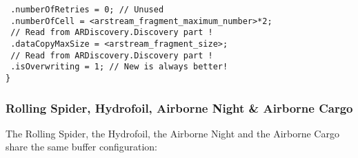 \begin{itemize}
{    \texttt{  .numberOfRetries = 0; // Unused}\\
    \texttt{  .numberOfCell = <arstream\_fragment\_maximum\_number>*2;}\\
    \texttt{                  // Read from ARDiscovery.Discovery part !}\\
    \texttt{  .dataCopyMaxSize = <arstream\_fragment\_size>;}\\
    \texttt{                     // Read from ARDiscovery.Discovery part !}\\
    \texttt{  .isOverwriting = 1; // New is always better!}\\
    \texttt{\}}
}
\end{itemize}

\newpage

\subsubsection{Rolling Spider, Hydrofoil, Airborne Night \& Airborne Cargo}

The Rolling Spider, the Hydrofoil, the Airborne Night and the Airborne Cargo share the same buffer configuration:
